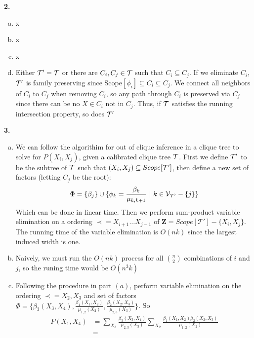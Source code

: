 \documentclass{article}
\begin{document}
\textbf{2.}
\begin{enumerate}[(a)]
    \item x 
    \item x 
    \item x 
    \item Either $\cal{T}' = \cal{T}$ or there are $C_i, C_j \in \cal{T}$ such that $C_i \subseteq C_j$. If we eliminate $C_i$, $\cal{T}'$ is family preserving since Scope$[\phi_i] \subseteq C_i \subseteq C_j$. We connect all neighbors of $C_i$ to $C_j$ when removing $C_i$, so any path through $C_i$ is preserved via $C_j$ since there can be no $X \in C_i$ not in $C_j$. Thus, if $\cal{T}$ satisfies the running intersection property, so does $\cal{T}'$
\end{enumerate}
\textbf{3.} 
\begin{enumerate}[(a)]
    \item We can follow the algorithim for out of clique inference in a clique tree to solve for $P(X_i, X_j)$, given a calibrated clique tree $\cal{T}$. First we define $\cal{T}'$ to be the subtree of $\cal{T}$ such that $(X_i, X_j) \subseteq Scope[\cal{T}']$, then define a new set of factors (letting $C_j$ be the root): \begin{equation*} 
        \Phi = \{\beta_j\} \cup \{ \phi_k = \frac{\beta_k}{\mu_{k, k + 1}} \ | \ k \in \mathcal{V}_{\cal{T'}} - \{j\} \}
    \end{equation*}
    Which can be done in linear time. Then we perform sum-product variable elimination on a ordering $\prec= X_{i + 1} \dots X_{j - 1}$ of $\mathbf{Z} = Scope[\mathcal{T'}] - \{X_i, X_j\}$. The running time of the variable elimination is $O(nk)$ since the largest induced width is one. 
    \item Naively, we must run the $O(nk)$ process for all $\binom{n}{2}$ combinations of $i$ and $j$, so the runing time would be $O(n^3k)$
    \item Following the procedure in part $(a)$, perform variable elimination on the ordering $\prec =X_2, X_3 $ and set of factors $\Phi = \{\beta_3(X_3, X_4), \frac{\beta_1(X_1, X_2)}{\mu_{1, 2}(X_2)}, \frac{\beta_2(X_2, X_3)}{\mu_{2, 3}(X_3)}\}$. So \begin{align*}
        P(X_1, X_4) &= \sum_{X_3} \frac{\beta_3(X_3, X_4)}{\mu_{2, 3}(X_3)} \sum_{X_2}\frac{\beta_1(X_1, X_2)\beta_2(X_2, X_3)}{\mu_{1, 2}(X_2)} \\
        &= 
    \end{align*}
\end{enumerate}
\end{document}
